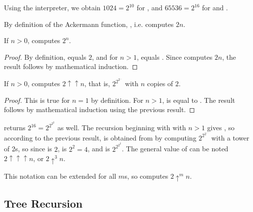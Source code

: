 \begin{exe}[1.10]
    Using the interpreter, we obtain $1024 = 2^{10}$ for , and 
    $65536 = 2^{16}$ for  and .

    By definition of the Ackermann function, , i.e.
     computes $2n$.

    \medskip

    If $n > 0$,  computes $2^n$.

    \begin{proof}
        By definition,  equals $2$, and for $n > 1$,  
        equals . Since  computes $2n$,
        the result follows by mathematical induction.
    \end{proof}

    \medskip

    If $n > 0$,  computes $2 \uparrow \uparrow n$, that is, 
    $2^{2^{2^{…}}}$ with $n$ copies of $2$.

    \begin{proof}
        This is true for $n = 1$ by definition. For $n > 1$,  is 
        equal to\linebreak
        . The result follows by mathematical induction 
        using the previous result.
    \end{proof}

    \medskip

    \begin{remark}
         returns $2^{16} = 2^{2^{2^2}}$ as well. The recursion 
        beginning with  with\linebreak
        $n > 1$ gives , so according to the previous 
        result,  is obtained from  by 
        computing $2^{2^{2^{…}}}$ with a tower of
         2s, so since  is $2$,  
        is $2^2 = 4$, and  is $2^{2^{2^2}}$. The general value of 
         can be noted $2 \uparrow \uparrow \uparrow n$, or $2 
        \uparrow^3 n$.

        This notation can be extended for all $m$s, so  computes 
        $2 \uparrow^m n$.
    \end{remark}
\end{exe}

\subsection{Tree Recursion}


